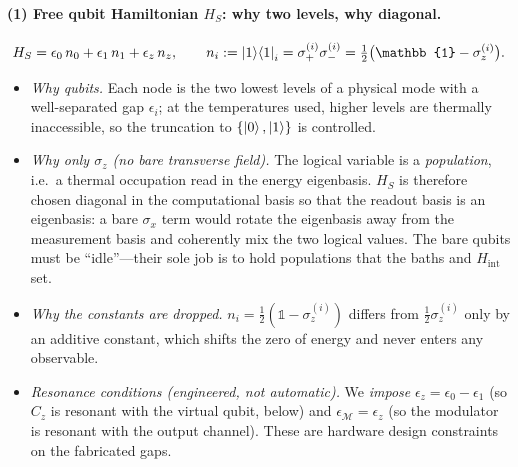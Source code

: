 \documentclass[11pt,a4paper]{article}
\theoremstyle{definition}
\theoremstyle{remark}
\begin{document}
\paragraph{(1) Free qubit Hamiltonian $H_S$: why two levels, why diagonal.}
\begin{equation}
H_S=\epsilon_0\,n_0+\epsilon_1\,n_1+\epsilon_z\,n_z,
\qquad
n_i:=\ket{1}\!\bra{1}_i=\sigma_+^{(i)}\sigma_-^{(i)}
=\tfrac12\big(\mathbb{1}-\sigma_z^{(i)}\big).
\label{eq:HS}
\end{equation}
\begin{itemize}
\item \emph{Why qubits.} Each node is the two lowest levels of a
physical mode with a well-separated gap $\epsilon_i$; at the
temperatures used, higher levels are thermally inaccessible, so the
truncation to $\{\ket{0},\ket{1}\}$ is controlled.
\item \emph{Why only $\sigma_z$ (no bare transverse field).} The
logical variable is a \emph{population}, i.e.\ a thermal occupation read
in the energy eigenbasis. $H_S$ is therefore chosen diagonal in the
computational basis so that the readout basis is an eigenbasis: a bare
$\sigma_x$ term would rotate the eigenbasis away from the measurement
basis and coherently mix the two logical values. The bare qubits must
be ``idle''---their sole job is to hold populations that the baths and
$H_{\mathrm{int}}$ set.
\item \emph{Why the constants are dropped.} $n_i=\tfrac12(\mathbb1-\sigma_z^{(i)})$
differs from $\tfrac12\sigma_z^{(i)}$ only by an additive constant, which
shifts the zero of energy and never enters any observable.
\item \emph{Resonance conditions (engineered, not automatic).}
We \emph{impose}
$\epsilon_z=\epsilon_0-\epsilon_1$ (so $C_z$ is resonant with the
virtual qubit, below) and $\epsilon_\mathcal{M}=\epsilon_z$ (so the
modulator is resonant with the output channel). These are hardware
design constraints on the fabricated gaps.
\end{itemize}
\end{document}
